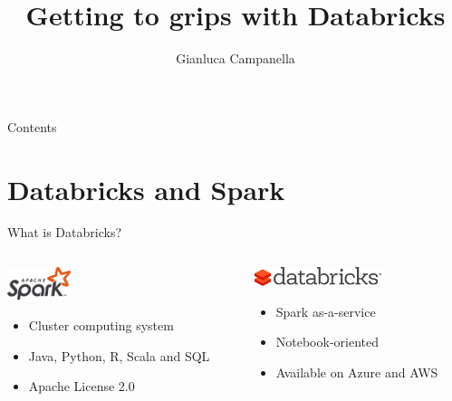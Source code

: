\documentclass[12pt,aspectratio=169]{beamer}
\title{Getting to grips with Databricks}
\author{Gianluca Campanella}
\date{}
\begin{document}
\maketitle

\begin{frame}{Contents}
    \tableofcontents[hideallsubsections]
\end{frame}

\section{Databricks and Spark}

\begin{frame}{What is Databricks?}
    \begin{columns}[b]
        \begin{column}{0.5\textwidth}
            \vfill
            \begin{center}
                \includegraphics[width=5em]{figures/spark}
            \end{center}
            \vfill
            \begin{itemize}
                \item Cluster computing system
                \item Java, Python, R, Scala and SQL
                \item Apache License 2.0
            \end{itemize}
        \end{column}
        \begin{column}{0.5\textwidth}
            \vfill
            \begin{center}
                \includegraphics[width=10em]{figures/databricks}
            \end{center}
            \vfill
            \begin{itemize}
                \item Spark as\hyp{}a\hyp{}service
                \item Notebook\hyp{}oriented
                \item Available on Azure and AWS
            \end{itemize}
        \end{column}
    \end{columns}
\end{frame}
\end{document}
